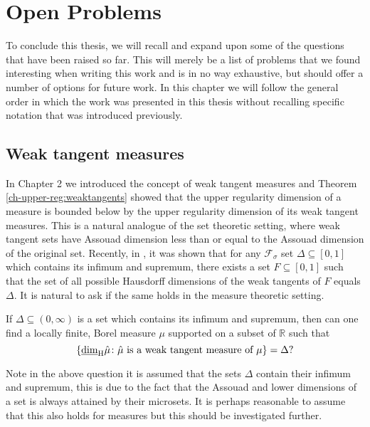 \chapter{Open Problems}
\label{chap:conclusion}



To conclude this thesis, we will recall and expand upon some of the questions that have been raised so far. This will merely be a list of problems that we found interesting when writing this work and is in no way exhaustive, but should offer a number of options for future work. In this chapter we will follow the general order in which the work was presented in this thesis without recalling specific notation that was introduced previously.


\section{Weak tangent measures}\label{ch-conclusion:weak-tangents}

In Chapter 2 we introduced the concept of weak tangent measures and Theorem \ref{ch-upper-reg:weaktangents} showed that the upper regularity dimension of a measure is bounded below by the upper regularity dimension of its weak tangent measures. This is a natural analogue of the set theoretic setting, where weak tangent sets have Assouad dimension less than or equal to the Assouad dimension of the original set. Recently, in \cite{microsets}, it was shown that for any $\mathcal{F}_{\sigma}$ set $\Delta \subseteq [0,1]$ which contains its infimum and supremum, there exists a set $F \subseteq [0,1]$ such that the set of all possible Hausdorff dimensions of the weak tangents of $F$ equals $\Delta$. It is natural to ask if the same holds in the measure theoretic setting.

\begin{question}
If $\Delta \subseteq (0,\infty)$ is a set which contains its infimum and supremum, then can one find a locally finite, Borel measure $\mu$ supported on a subset of $\mathbb{R}$ such that
\[
\left\{ \underline{\dim}_{\textup{H}} \hat{\mu} \colon \hat{\mu} \textup{ is a weak tangent measure of } \mu \right\} = \Delta ?
\]
\end{question}

Note in the above question it is assumed that the sets $\Delta$ contain their infimum and supremum, this is due to the fact that the Assouad and lower dimensions of a set is always attained by their microsets. It is perhaps reasonable to assume that this also holds for measures but this should be investigated further.

